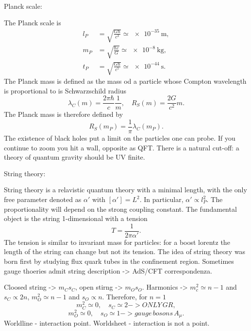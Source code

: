 Planck scale:

The Planck scale is 
\begin{equation}
    \begin{aligned}
    l_P &= \sqrt{\frac{G\hbar}{c^3}} \simeq \SI{e-35}{\meter}, \\
    m_P &= \sqrt{\frac{\hbar c}{G}} \simeq \SI{e-8}{\kg}, \\
    t_P &= \sqrt{\frac{G\hbar}{c^5}} \simeq \SI{e-44}{\second}.
\end{aligned}
\end{equation}
The Planck mass is defined as the mass od a particle whose Compton wavelength is proportional to is Schwarzschild radius
\begin{equation}
    \lambda_C(m) = \frac{2\pi\hbar}{c}\frac{1}{m},\quad R_S(m) = \frac{2G}{c^2}m.
\end{equation}
The Planck mass is therefore defined by
\begin{equation}
    R_S(m_P) = \frac{1}{\pi}\lambda_C(m_P).
\end{equation}
The existence of black holes put a limit on the particles one can probe. If you continue to zoom you hit a wall, opposite as QFT. There is a natural cut-off: a theory of quantum gravity should be UV finite. 

String theory:

String theory is a relavistic quantum theory with a minimal length, with the only free parameter denoted as $\alpha'$ with $[\alpha'] = L^2$. In particular, $\alpha' \propto l_P^2$. The proportionality will depend on the strong coupling constant. The fundamental object is the string 1-dimensional with a tension
\begin{equation}
    T = \frac{1}{2\pi\alpha'}.
\end{equation}
The tension is similar to invariant mass for particles: for a boost lorentz the length of the string can change but not its tension. The idea of string theory was born first by studying flux quark tubes in the confinement region. Sometimes gauge thoeries admit string description -> AdS/CFT correspondenza. 

Cloosed string -> $m_Cs_C$, open stirng -> $m_Os_O$. Harmonics -> $m_c^2 \simeq n - 1$ and $s_C \propto 2n$, $m_O^2 \simeq n - 1$ and $s_O \propto n$. Therefore, for $n = 1$
\begin{equation}
    m_C^2 \simeq 0,\quad s_C \simeq 2 -> ONLY\,GR,
\end{equation}
\begin{equation}
    m_O^2 \simeq 0,\quad s_O \simeq 1 -> gauge\,bosons\,A_\mu.
\end{equation}
Worldline - interaction point. Worldsheet - interaction is not a point.